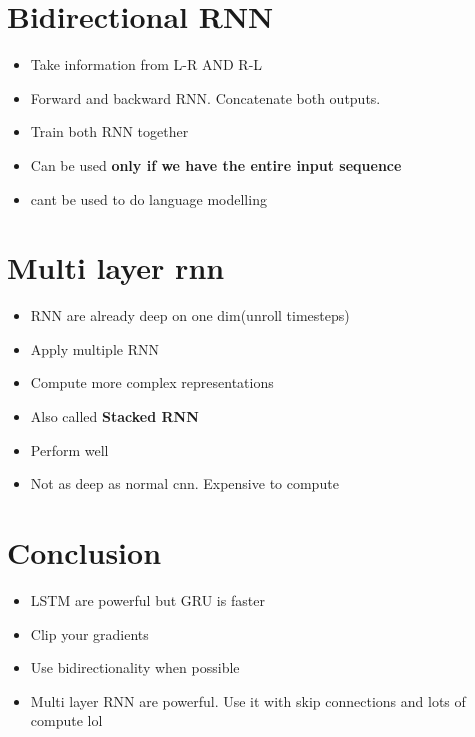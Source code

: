 \documentclass[a4paper]{article}
\begin{document}
\section{Bidirectional RNN}
\begin{itemize}
    \item Take information from L-R AND R-L
    \item Forward and backward RNN. Concatenate both outputs.
    \item Train both RNN together
    \item Can be used \textbf{only if we have the entire input sequence}  
    \item cant be used to do language modelling
\end{itemize}
\section{Multi layer rnn}
\begin{itemize}
    \item RNN are already deep on one dim(unroll timesteps)
    \item Apply multiple RNN
    \item Compute more complex representations
    \item Also called \textbf{Stacked RNN}  
    \item Perform well
    \item Not as deep as normal cnn. Expensive to compute
\end{itemize}
\section{Conclusion}
\begin{itemize}
    \item LSTM are powerful but GRU is faster
    \item Clip your gradients
    \item Use bidirectionality when possible
    \item Multi layer RNN are powerful. Use it with skip connections and lots of compute lol
\end{itemize}
\end{document}

